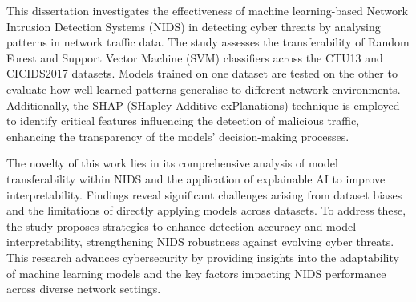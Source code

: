 \setlength{\parindent}{0pt}

This dissertation investigates the effectiveness of machine learning-based Network Intrusion Detection Systems (NIDS) in detecting cyber threats by analysing patterns in network traffic data. The study assesses the transferability of Random Forest and Support Vector Machine (SVM) classifiers across the CTU13 and CICIDS2017 datasets. Models trained on one dataset are tested on the other to evaluate how well learned patterns generalise to different network environments. Additionally, the SHAP (SHapley Additive exPlanations) technique is employed to identify critical features influencing the detection of malicious traffic, enhancing the transparency of the models’ decision-making processes.

The novelty of this work lies in its comprehensive analysis of model transferability within NIDS and the application of explainable AI to improve interpretability. Findings reveal significant challenges arising from dataset biases and the limitations of directly applying models across datasets. To address these, the study proposes strategies to enhance detection accuracy and model interpretability, strengthening NIDS robustness against evolving cyber threats. This research advances cybersecurity by providing insights into the adaptability of machine learning models and the key factors impacting NIDS performance across diverse network settings.